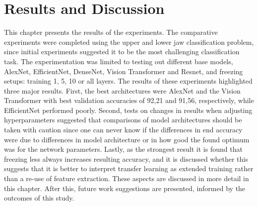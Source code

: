 \documentclass[english,twoside,openright]{UH_DS_MSc}
\begin{document}
\chapter{Results and Discussion}

This chapter presents the results of the experiments. The comparative experiments were completed using the 
upper and lower jaw classification problem, since initial experiments suggested it to be the most challenging 
classification task. The experimentation was limited to testing out different base models, AlexNet, EfficientNet, 
DenseNet, Vision Transformer and Resnet, and freezing setups: training 1, 5, 10 or all layers.
The results of these experiments highlighted three major results. First, the best architectures were AlexNet and the Vision 
Transformer with best validation accuracies of 92,21 and 91,56, respectively, while EfficientNet performed poorly. Second, tests on changes in results 
when adjusting hyperparameters suggested that comparisons of model architectures should be taken with caution since one can never know 
if the differences in end accuracy were due to differences in model architecture or in how good the found optimum was 
for the network parameters. Lastly, as the strongest result it is found that freezing less 
always increases resulting accuracy, and it is discussed whether this suggests that it is better to interpret transfer learning as extended 
training rather than a re-use of feature extraction. These aspects are discussed in more detail in this chapter. After this, future work 
suggestions are presented, informed by the outcomes of this study.
\end{document}
